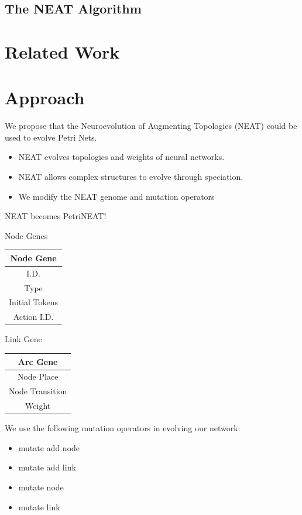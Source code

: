 \documentclass[12pt,a4paper,twocolumn]{article}
\begin{document}
\subsection{The NEAT Algorithm}

\section{Related Work}

\section{Approach}


We propose that the Neuroevolution of Augmenting Topologies (NEAT) could be used to evolve Petri Nets.
\begin{itemize}
\item NEAT evolves topologies and weights of neural networks.
\item NEAT allows complex structures to evolve through speciation.
\item We modify the NEAT genome and mutation operators
\end{itemize}
NEAT becomes PetriNEAT!

Node Genes
\begin{table}
\centering
\begin{tabular}{|c|}
\hline
Node Gene\\ \hline
I.D. \\
Type \\
Initial Tokens \\
Action I.D. \\
\hline
\end{tabular}
\end{table}

Link Gene
\begin{table}
\centering
\begin{tabular}{|c|}
\hline
Arc Gene\\ \hline
Node Place \\
Node Transition \\
Weight \\
\hline
\end{tabular}
\end{table}

We use the following mutation operators in evolving our network:
\begin{itemize}
\item mutate add node
\item mutate add link
\item mutate node
\item mutate link
\end{itemize}
\end{document}
